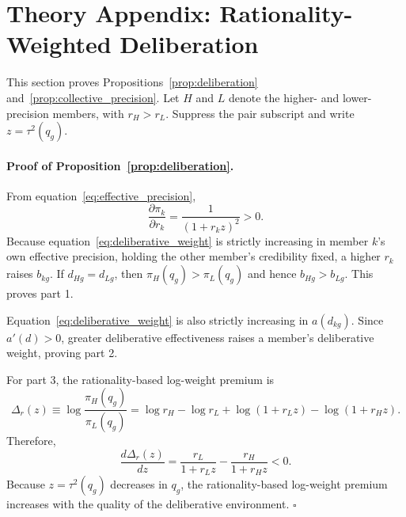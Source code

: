 \documentclass[11 pt]{article}
\begin{document}

\newpage

\section{Theory Appendix: Rationality-Weighted Deliberation}\label{appendix:deliberation}
\label{app:framework}

This section proves Propositions~\ref{prop:deliberation} and~\ref{prop:collective_precision}. Let $H$ and $L$ denote the higher- and lower-precision members, with $r_H>r_L$. Suppress the pair subscript and write $z=\tau^2(q_g)$.

\paragraph{Proof of Proposition~\ref{prop:deliberation}.}
From equation~\eqref{eq:effective_precision},
\begin{equation}
    \frac{\partial \pi_k}{\partial r_k}=\frac{1}{(1+r_k z)^2}>0.
    \label{eq:pi_derivative}
\end{equation}
Because equation~\eqref{eq:deliberative_weight} is strictly increasing in member $k$'s own effective precision, holding the other member's credibility fixed, a higher $r_k$ raises $b_{kg}$. If $d_{Hg}=d_{Lg}$, then $\pi_H(q_g)>\pi_L(q_g)$ and hence $b_{Hg}>b_{Lg}$. This proves part 1.

Equation~\eqref{eq:deliberative_weight} is also strictly increasing in $a(d_{kg})$. Since $a'(d)>0$, greater deliberative effectiveness raises a member's deliberative weight, proving part 2.

For part 3, the rationality-based log-weight premium is
\begin{equation}
    \Delta_r(z)\equiv\log\frac{\pi_H(q_g)}{\pi_L(q_g)}=
    \log r_H-\log r_L+\log(1+r_Lz)-\log(1+r_Hz).
    \label{eq:rationality_premium}
\end{equation}
Therefore,
\begin{equation}
    \frac{d\Delta_r(z)}{dz}=
    \frac{r_L}{1+r_Lz}-\frac{r_H}{1+r_Hz}<0.
    \label{eq:rationality_premium_derivative}
\end{equation}
Because $z=\tau^2(q_g)$ decreases in $q_g$, the rationality-based log-weight premium increases with the quality of the deliberative environment. \hfill$\square$

\end{document}
